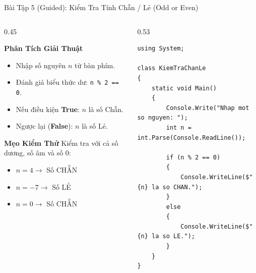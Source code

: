 \documentclass[aspectratio=169, 10pt]{beamer}
\begin{document}
\begin{frame}[fragile]{Bài Tập 5 (Guided): Kiểm Tra Tính Chẵn / Lẻ (Odd or Even)}
  \begin{columns}[T]
    \begin{column}{0.45\textwidth}
      \begin{block}{\textbf{Phân Tích Giải Thuật}}
        \begin{itemize}
          \item Nhập số nguyên $n$ từ bàn phím.
          \item Đánh giá biểu thức dư: \texttt{n \% 2 == 0}.
          \item Nếu điều kiện \textbf{True}: $n$ là số Chẵn.
          \item Ngược lại (\textbf{False}): $n$ là số Lẻ.
        \end{itemize}
      \end{block}
      \begin{exampleblock}{\textbf{Mẹo Kiểm Thử}}
        Kiểm tra với cả số dương, số âm và số 0:
        \begin{itemize}
          \item $n = 4 \to$ Số CHẴN
          \item $n = -7 \to$ Số LẺ
          \item $n = 0 \to$ Số CHẴN
        \end{itemize}
      \end{exampleblock}
    \end{column}
    \begin{column}{0.53\textwidth}
\begin{lstlisting}
using System;

class KiemTraChanLe
{
    static void Main()
    {
        Console.Write("Nhap mot so nguyen: ");
        int n = int.Parse(Console.ReadLine());

        if (n % 2 == 0)
        {
            Console.WriteLine($"{n} la so CHAN.");
        }
        else
        {
            Console.WriteLine($"{n} la so LE.");
        }
    }
}
\end{lstlisting}
    \end{column}
  \end{columns}
\end{frame}
\end{document}
